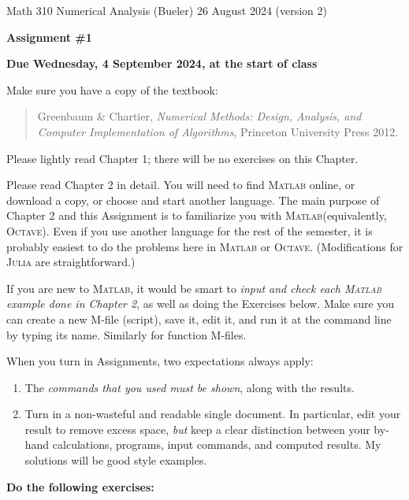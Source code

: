 \documentclass[12pt]{amsart}
\newcommand{\Julia}{\textsc{Julia}\xspace}
\newcommand{\Matlab}{\textsc{Matlab}\xspace}
\newcommand{\Octave}{\textsc{Octave}\xspace}
\begin{document}
\scriptsize \noindent Math 310 Numerical Analysis (Bueler) \hfill 26 August 2024 (version 2)
\normalsize

\medskip\bigskip

\Large\centerline{\textbf{Assignment \#1}}
\large
\bigskip

\centerline{\textbf{Due Wednesday, 4 September 2024, at the start of class}}
\bigskip
\normalsize

\thispagestyle{empty}

\bigskip
\noindent Make sure you have a copy of the textbook:

\begin{quote}
Greenbaum \& Chartier, \emph{Numerical Methods: Design, Analysis, and Computer Implementation of Algorithms}, Princeton University Press 2012.
\end{quote}

\bigskip
\noindent Please lightly read Chapter 1; there will be no exercises on this Chapter.

\bigskip
\noindent Please read Chapter 2 in detail.  You will need to find \Matlab online, or download a copy, or choose and start another language.  The main purpose of Chapter 2 and this Assignment is to familiarize you with \Matlab (equivalently, \Octave).  Even if you use another language for the rest of the semester, it is probably easiest to do the problems here in \Matlab or \Octave.  (Modifications for \Julia are straightforward.)

\bigskip
\noindent If you are new to \Matlab, it would be smart to \emph{input and check each \Matlab example done in Chapter 2}, as well as doing the Exercises below.  Make sure you can create a new M-file (script), save it, edit it, and run it at the command line by typing its name.  Similarly for function M-files.

\bigskip
\noindent When you turn in Assignments, two expectations always apply:
\renewcommand{\labelenumi}{\arabic{enumi}.\,}
\begin{enumerate}
\item The \emph{commands that you used must be shown}, along with the results.
\item Turn in a non-wasteful and readable single document.  In particular, edit your result to remove excess space, \emph{but} keep a clear distinction between your by-hand calculations, programs, input commands, and computed results.  My solutions will be good style examples.
\end{enumerate}

\bigskip\bigskip
\noindent \textbf{Do the following exercises:}
\end{document}
